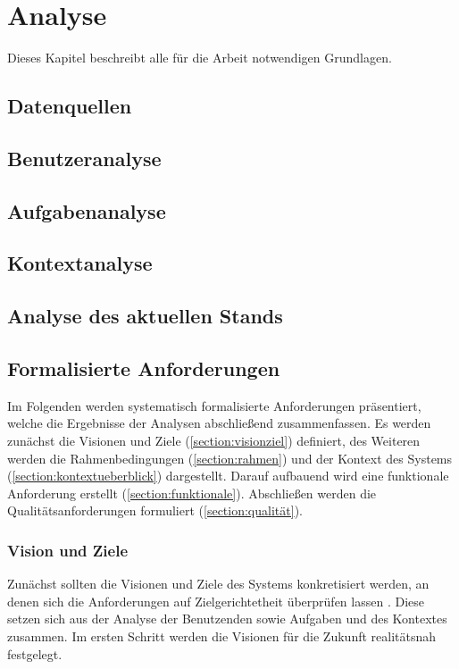 
\chapter{Analyse}
\label{chapter-analyse}

Dieses Kapitel beschreibt alle für die Arbeit notwendigen Grundlagen.

\section{Datenquellen}
\label{section:daten}

\section{Benutzeranalyse}
\label{section:benutzer}

\section{Aufgabenanalyse}
\label{section:aufgaben}

\section{Kontextanalyse}
\label{section:kontext}

\section{Analyse des aktuellen Stands}
\label{section:iststand}

\section{Formalisierte Anforderungen}
\label{section:anforderung}

Im Folgenden werden systematisch formalisierte Anforderungen präsentiert, welche die Ergebnisse der Analysen abschließend zusammenfassen.
Es werden zunächst die Visionen und Ziele (\ref{section:visionziel}) definiert, des Weiteren werden
die Rahmenbedingungen (\ref{section:rahmen}) und der Kontext des Systems
(\ref{section:kontextueberblick}) dargestellt. Darauf aufbauend wird eine funktionale Anforderung
erstellt (\ref{section:funktionale}). Abschließen werden die Qualitätsanforderungen formuliert
(\ref{section:qualität}).


\subsection*{Vision und Ziele}
\label{section:visionziel}
Zunächst sollten die Visionen und Ziele des Systems konkretisiert werden, an denen sich die
Anforderungen auf Zielgerichtetheit überprüfen lassen \cite{balzert2009}. Diese setzen sich aus der
Analyse der Benutzenden sowie Aufgaben und des Kontextes zusammen. Im ersten Schritt werden die
Visionen für die Zukunft realitätsnah festgelegt.



